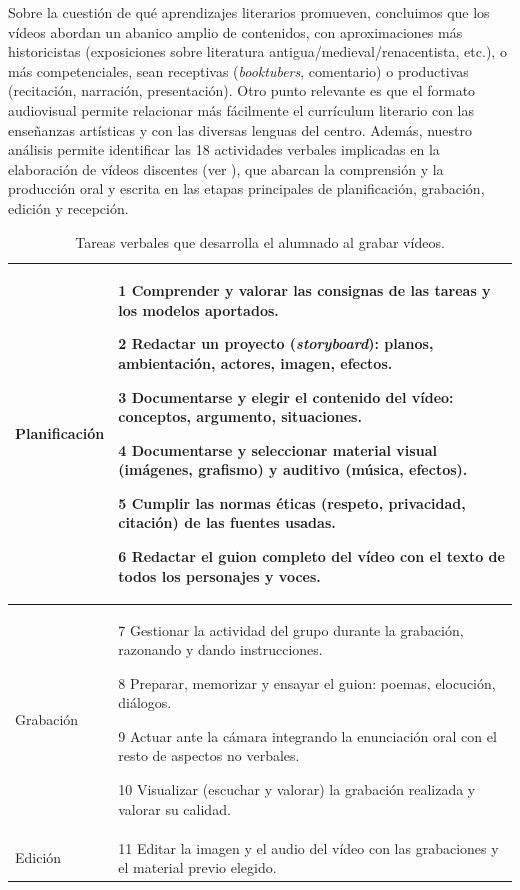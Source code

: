 \documentclass[spanish]{textolivre}
\begin{document}
Sobre la cuestión de qué aprendizajes literarios promueven, concluimos que los vídeos abordan un abanico amplio de contenidos, con aproximaciones más historicistas (exposiciones sobre literatura antigua/medieval/renacentista, etc.), o más competenciales, sean receptivas (\textit{booktubers}, comentario) o productivas (recitación, narración, presentación). Otro punto relevante es que el formato audiovisual permite relacionar más fácilmente el currículum literario con las enseñanzas artísticas y con las diversas lenguas del centro.
Además, nuestro análisis permite identificar las 18 actividades verbales implicadas en la elaboración de vídeos discentes (ver ), que abarcan la comprensión y la producción oral y escrita en las etapas principales de planificación, grabación, edición y recepción.

\begin{table}[htbp]
\caption{Tareas verbales que desarrolla el alumnado al grabar vídeos.}
\label{tbl2}
\centering \small
\begin{tabular}{p{2cm} p{12cm}}
\toprule
Planificación & 1 Comprender y valorar las consignas de las tareas y los modelos aportados.

    2 Redactar un proyecto (\textit{storyboard}): planos, ambientación, actores, imagen, efectos.
    
    3 Documentarse y elegir el contenido del vídeo: conceptos, argumento, situaciones.
    
    4 Documentarse y seleccionar material visual (imágenes, grafismo) y auditivo (música, efectos).
    
    5 Cumplir las normas éticas (respeto, privacidad, citación) de las fuentes usadas.
    
    6 Redactar el guion completo del vídeo con el texto de todos los personajes y voces. \\ 
\midrule
Grabación     & 7 Gestionar la actividad del grupo durante la grabación, razonando y dando instrucciones.

    8 Preparar, memorizar y ensayar el guion: poemas, elocución, diálogos.
    
    9 Actuar ante la cámara integrando la enunciación oral con el resto de aspectos no verbales.
    
    10 Visualizar (escuchar y valorar) la grabación realizada y valorar su calidad.  \\ 
\midrule
Edición &     11 Editar la imagen y el audio del vídeo con las grabaciones y el material previo elegido.


\end{tabular}
\end{table}
\end{document}

